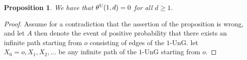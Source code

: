 \documentclass{article}
\newtheorem{prop}[theorem]{Proposition}
\theoremstyle{definition}
\newcommand{\1}{\mathbbm{1}}
\newcommand{\0}{\mathbf{o}}
\begin{document}
\begin{prop}
    We have that $\theta^{\rm U}(1,d)=0$ for all $d \geq 1$.
\end{prop}
\begin{proof}
Assume for a contradiction that the assertion of the proposition is wrong, and let $A$ then denote the event of positive probability that there exists an infinite path starting from $o$ consisting of edges of the $1$-UnG. %
let $X_0=o,X_1,X_2,\ldots$ be any infinite path of the $1$-UnG starting from $o$.

\end{proof}
\end{document}
